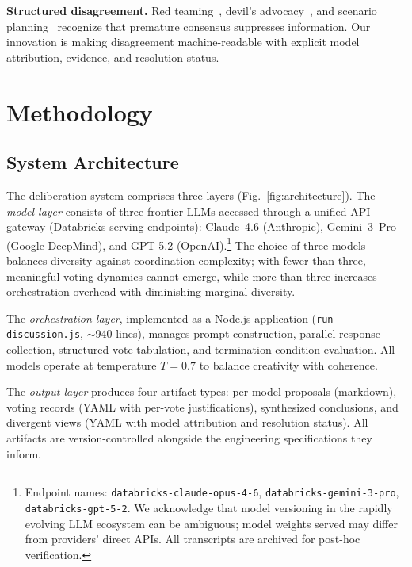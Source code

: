 \documentclass[11pt,a4paper]{article}
\begin{document}
\textbf{Structured disagreement.} Red teaming~\cite{zenko2015red}, devil's advocacy~\cite{schwenk1990effects}, and scenario planning~\cite{schwartz1996art} recognize that premature consensus suppresses information. Our innovation is making disagreement machine-readable with explicit model attribution, evidence, and resolution status.

\section{Methodology}
\label{sec:methodology}

\subsection{System Architecture}
\label{sec:architecture}

The deliberation system comprises three layers (Fig.~\ref{fig:architecture}). The \emph{model layer} consists of three frontier LLMs accessed through a unified API gateway (Databricks serving endpoints): Claude~4.6 (Anthropic), Gemini~3~Pro (Google DeepMind), and GPT-5.2 (OpenAI).\footnote{Endpoint names: \texttt{databricks-claude-opus-4-6}, \texttt{databricks-gemini-3-pro}, \texttt{databricks-gpt-5-2}. We acknowledge that model versioning in the rapidly evolving LLM ecosystem can be ambiguous; model weights served may differ from providers' direct APIs. All transcripts are archived for post-hoc verification.} The choice of three models balances diversity against coordination complexity; with fewer than three, meaningful voting dynamics cannot emerge, while more than three increases orchestration overhead with diminishing marginal diversity.

The \emph{orchestration layer}, implemented as a Node.js application (\texttt{run-discussion.js}, $\sim$940 lines), manages prompt construction, parallel response collection, structured vote tabulation, and termination condition evaluation. All models operate at temperature $T = 0.7$ to balance creativity with coherence.

The \emph{output layer} produces four artifact types: per-model proposals (markdown), voting records (YAML with per-vote justifications), synthesized conclusions, and divergent views (YAML with model attribution and resolution status). All artifacts are version-controlled alongside the engineering specifications they inform.
\end{document}
